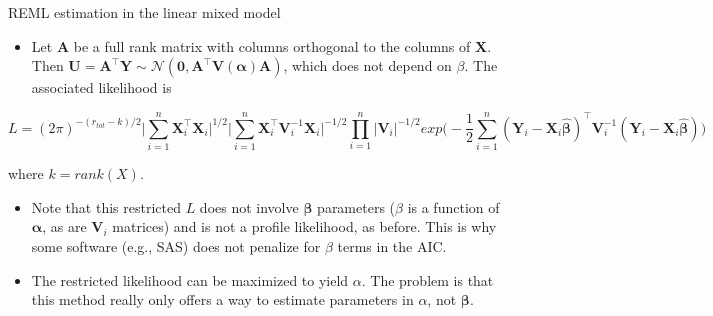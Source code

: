 \documentclass[
  9pt,
  ignorenonframetext,
]{beamer}
\providecommand{\tightlist}{%
  \setlength{\itemsep}{0pt}\setlength{\parskip}{0pt}}
\begin{document}
\begin{frame}{REML estimation in the linear mixed model}
\protect\hypertarget{reml-estimation-in-the-linear-mixed-model}{}
\begin{itemize}
\tightlist
\item
  Let \(\pmb A\) be a full rank matrix with columns orthogonal to the
  columns of \(\pmb X\). Then
  \(\pmb U= \pmb {A^{\top} Y} \sim \mathcal N(\pmb 0, \pmb{A^{\top} V(\alpha)A})\),
  which does not depend on \(\beta\). The associated likelihood is
\end{itemize}

\[
L=(2\pi)^{-(r_{tot}-k)/2} \Big|\sum_{i=1}^n \pmb X_i^{\top} \pmb X_i \Big|^ {1/2} \Big|\sum_{i=1}^n \pmb X_i^{\top} \pmb V_i^{-1} \pmb X_i \Big|^{-1/2} \prod_{i=1}^n |\pmb V_i |^{-1/2} exp \Big(-\frac 1 2 \sum_{i=1}^n (\pmb Y_i-\pmb X_i \pmb{\hat \beta})^{\top} 
\pmb V_i^{-1} (\pmb Y_i - \pmb X_i \pmb {\hat\beta})\Big)
\]

where \(k=rank(X)\).

\begin{itemize}
\item
  Note that this restricted \(L\) does not involve \(\pmb \beta\)
  parameters (\(\hat \beta\) is a function of \(\pmb \alpha\), as are
  \(\pmb V_i\) matrices) and is not a profile likelihood, as before.
  This is why some software (e.g., SAS) does not penalize for \(\beta\)
  terms in the AIC.
\item
  The restricted likelihood can be maximized to yield \(\alpha\). The
  problem is that this method really only offers a way to estimate
  parameters in \(\alpha\), not \(\pmb \beta\).
\end{itemize}
\end{frame}
\end{document}
